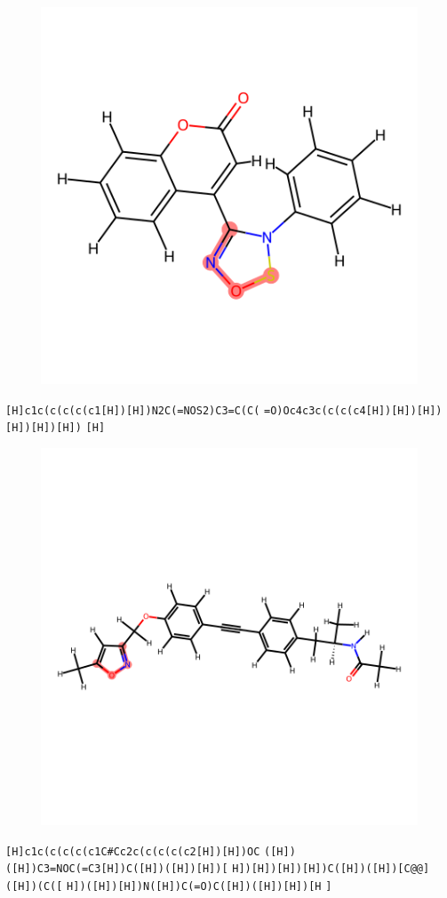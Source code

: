 \documentclass{article}
\begin{document}
\begin{figure}[ht]
\centering
    \includegraphics{mol00.png}
\end{figure}
\verb|[H]c1c(c(c(c(c1[H])[H])N2C(=NOS2)C3=C(C(| \verb|=O)Oc4c3c(c(c(c4[H])[H])[H])[H])[H])[H])| \verb|[H]|

\begin{figure}[ht]
\centering
    \includegraphics{mol01.png}
\end{figure}
\verb|[H]c1c(c(c(c(c1C#Cc2c(c(c(c(c2[H])[H])OC| \verb|([H])([H])C3=NOC(=C3[H])C([H])([H])[H])[| \verb|H])[H])[H])[H])C([H])([H])[C@@]([H])(C([| \verb|H])([H])[H])N([H])C(=O)C([H])([H])[H])[H| \verb|]|
\end{document}
